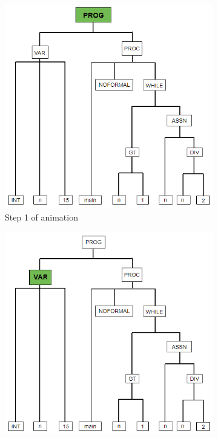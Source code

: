 \documentclass{l4proj}
\begin{document}
\begin{figure}[h]
	\centering
	\begin{subfigure}[b]{.33\textwidth}
		\centering
		\includegraphics[width=\linewidth]{images/animation-active-wireframe.png}
		\caption{Step 1 of animation}
		\label{fig:anim-step-1}
	\end{subfigure}%
	\begin{subfigure}[b]{.33\textwidth}
		\centering
		\includegraphics[width=\linewidth]{images/animation-active-wireframe2.png}

\end{subfigure}
\end{figure}
\end{document}
